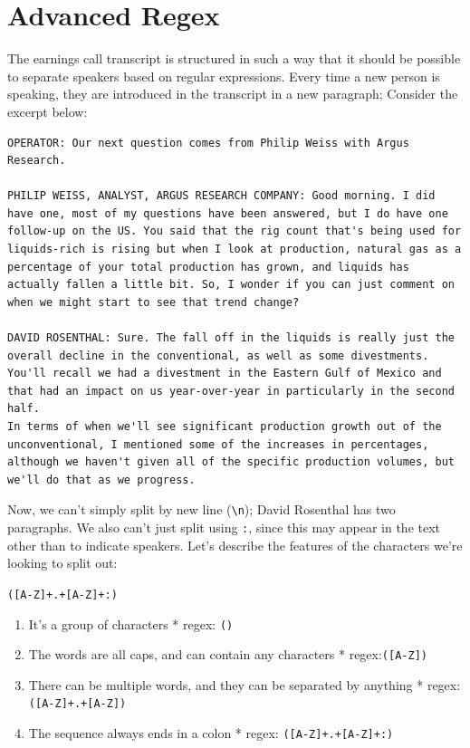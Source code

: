\documentclass[
  letterpaper,
  DIV=11,
  numbers=noendperiod]{scrreprt}
\providecommand{\tightlist}{%
  \setlength{\itemsep}{0pt}\setlength{\parskip}{0pt}}\usepackage{longtable,booktabs,array}
\begin{document}
\hypertarget{advanced-regex}{%
\section{Advanced Regex}\label{advanced-regex}}

The earnings call transcript is structured in such a way that it should
be possible to separate speakers based on regular expressions. Every
time a new person is speaking, they are introduced in the transcript in
a new paragraph; Consider the excerpt below:

\begin{verbatim}
OPERATOR: Our next question comes from Philip Weiss with Argus Research.

PHILIP WEISS, ANALYST, ARGUS RESEARCH COMPANY: Good morning. I did have one, most of my questions have been answered, but I do have one follow-up on the US. You said that the rig count that's being used for liquids-rich is rising but when I look at production, natural gas as a percentage of your total production has grown, and liquids has actually fallen a little bit. So, I wonder if you can just comment on when we might start to see that trend change?

DAVID ROSENTHAL: Sure. The fall off in the liquids is really just the overall decline in the conventional, as well as some divestments. You'll recall we had a divestment in the Eastern Gulf of Mexico and that had an impact on us year-over-year in particularly in the second half.
In terms of when we'll see significant production growth out of the unconventional, I mentioned some of the increases in percentages, although we haven't given all of the specific production volumes, but we'll do that as we progress.
\end{verbatim}

Now, we can't simply split by new line (\texttt{\textbackslash{}n});
David Rosenthal has two paragraphs. We also can't just split using
\texttt{:}, since this may appear in the text other than to indicate
speakers. Let's describe the features of the characters we're looking to
split out:

\texttt{({[}A-Z{]}+.+{[}A-Z{]}+:)}

\begin{enumerate}
\def\labelenumi{\arabic{enumi}.}
\tightlist
\item
  It's a group of characters * regex: \texttt{()}
\item
  The words are all caps, and can contain any characters *
  regex:\texttt{({[}A-Z{]})}
\item
  There can be multiple words, and they can be separated by anything *
  regex: \texttt{({[}A-Z{]}+.+{[}A-Z{]})}
\item
  The sequence always ends in a colon * regex:
  \texttt{({[}A-Z{]}+.+{[}A-Z{]}+:)}
\end{enumerate}
\end{document}
